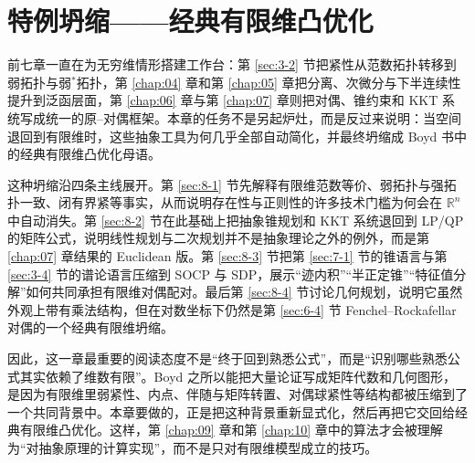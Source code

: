 \chapter{特例坍缩——经典有限维凸优化}

\label{chap:08}

前七章一直在为无穷维情形搭建工作台：第 \ref{sec:3-2} 节把紧性从范数拓扑转移到弱拓扑与弱$^\ast$拓扑，第 \ref{chap:04} 章和第 \ref{chap:05} 章把分离、次微分与下半连续性提升到泛函层面，第 \ref{chap:06} 章与第 \ref{chap:07} 章则把对偶、锥约束和 KKT 系统写成统一的原--对偶框架。本章的任务不是另起炉灶，而是反过来说明：当空间退回到有限维时，这些抽象工具为何几乎全部自动简化，并最终坍缩成 Boyd 书中的经典有限维凸优化母语。

这种坍缩沿四条主线展开。第 \ref{sec:8-1} 节先解释有限维范数等价、弱拓扑与强拓扑一致、闭有界紧等事实，从而说明存在性与正则性的许多技术门槛为何会在 $\mathbb R^n$ 中自动消失。第 \ref{sec:8-2} 节在此基础上把抽象锥规划和 KKT 系统退回到 LP/QP 的矩阵公式，说明线性规划与二次规划并不是抽象理论之外的例外，而是第 \ref{chap:07} 章结果的 Euclidean 版。第 \ref{sec:8-3} 节把第 \ref{sec:7-1} 节的锥语言与第 \ref{sec:3-4} 节的谱论语言压缩到 SOCP 与 SDP，展示“迹内积”“半正定锥”“特征值分解”如何共同承担有限维对偶配对。最后第 \ref{sec:8-4} 节讨论几何规划，说明它虽然外观上带有乘法结构，但在对数坐标下仍然是第 \ref{sec:6-4} 节 Fenchel--Rockafellar 对偶的一个经典有限维坍缩。

因此，这一章最重要的阅读态度不是“终于回到熟悉公式”，而是“识别哪些熟悉公式其实依赖了维数有限”。Boyd 之所以能把大量论证写成矩阵代数和几何图形，是因为有限维里弱紧性、内点、伴随与矩阵转置、对偶球紧性等结构都被压缩到了一个共同背景中。本章要做的，正是把这种背景重新显式化，然后再把它交回给经典有限维凸优化。这样，第 \ref{chap:09} 章和第 \ref{chap:10} 章中的算法才会被理解为“对抽象原理的计算实现”，而不是只对有限维模型成立的技巧。








